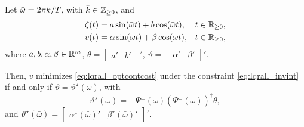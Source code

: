 \begin{lemma}
	\label{lem:lqrall_solstruct}
	Let $\bar{\omega} = 2\pi\bar{k}/T$, with $\bar{k}\in\mathbb{Z}_{\geq 0}$, and
	\begin{subequations}
		\label{eq:lqrall_singles}
		\begin{align}
			\label{eq:lqrall_singlezeta}
			\zeta(t) & = a \sin(\bar{\omega}t) + b \cos(\bar{\omega}t), & t\in\mathbb{R}_{\geq 0}, \\
			\label{eq:lqrall_singlefdecbis}
			v(t)     & = \alpha \sin(\bar{\omega}t) + \beta\cos(\bar{\omega}t), & t\in\mathbb{R}_{\geq 0},
		\end{align}
	\end{subequations}
	where $a,b,\alpha,\beta\in\mathbb{R}^m$, $\theta = \begin{bmatrix}a' & b'\end{bmatrix}'$, $\vartheta = \begin{bmatrix}\alpha' & \beta'\end{bmatrix}'$.

	Then, $v$ minimizes \eqref{eq:lqrall_optcontcost} under the constraint \eqref{eq:lqrall_invint} if and only if $\vartheta=\vartheta^{\star}(\bar{\omega})$, with
	\begin{equation}
		\label{eq:lqrall_optcoeffs}
		\vartheta^{\star}(\bar{\omega}) = -\Psi^{\perp}(\bar{\omega})(\Psi^{\perp}(\bar{\omega}))^{\dagger}\theta,
	\end{equation}
	and $\vartheta^{\star}(\bar{\omega}) = \begin{bmatrix}\alpha^{\star}(\bar{\omega})' & \beta^{\star}(\bar{\omega})'\end{bmatrix}'$.\closestatement
\end{lemma}
